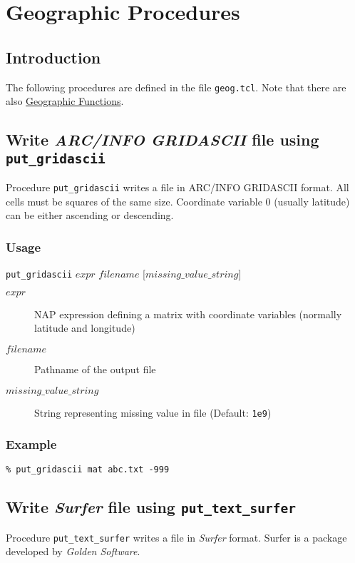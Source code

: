     \section{Geographic Procedures}

  \subsection{
    \label{Introduction}Introduction
  }
The following procedures are defined in the file 
  \texttt{geog.tcl}. Note that there are also 
  \href{geog.html}{Geographic Functions}.
  \subsection{
    \label{put-gridascii}Write \emph{ARC/INFO GRIDASCII} file using \texttt{put\_gridascii}
  }
Procedure 
  \texttt{put\_gridascii} writes a file in ARC/INFO GRIDASCII
  format. All cells must be squares of the same size. Coordinate
  variable 0 (usually latitude) can be either ascending or descending.
  \subsubsection{Usage}

  \texttt{put\_gridascii} $expr$ $filename$ [$missing\_value\_string$]
  \begin{description}
    \item[$expr$]
    NAP expression defining a matrix with coordinate variables (normally latitude and longitude)
    \item[$filename$]
    Pathname of the output file
    \item[$missing\_value\_string$]
    String representing missing value in file (Default: \texttt{1e9})
  \end{description}
  \subsubsection{Example}

  \texttt{\% put\_gridascii mat abc.txt -999}
  \subsection{
    \label{put-text-surfer}Write \emph{Surfer} file using \texttt{put\_text\_surfer}
  }
Procedure 
  \texttt{put\_text\_surfer} writes a file in 
  \emph{Surfer} format. Surfer is a package developed by 
  \emph{Golden Software}.

